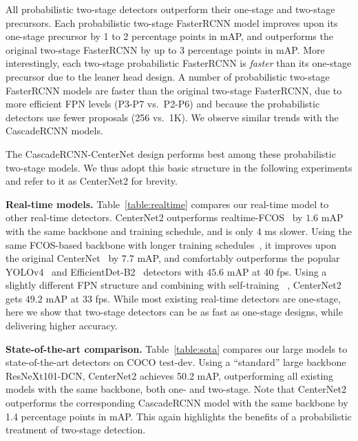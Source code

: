 \documentclass{article}
\renewcommand{\paragraph}[1]{\noindent\textbf{#1}}
\newcommand{\name}{CenterNet2 }
\begin{document}
All probabilistic two-stage detectors outperform their one-stage and two-stage precursors.
Each probabilistic two-stage FasterRCNN model improves upon its one-stage precursor by 1 to 2 percentage points in mAP, and outperforms the original two-stage FasterRCNN by up to 3 percentage points in mAP.
More interestingly, each two-stage probabilistic FasterRCNN is \emph{faster} than its one-stage precursor due to the leaner head design.
A number of probabilistic two-stage FasterRCNN models are faster than the original two-stage FasterRCNN, due to more efficient FPN levels (P3-P7 vs.\ P2-P6) and because the probabilistic detectors 
use
fewer proposals (256 vs.\ 1K).
We observe similar trends with the CascadeRCNN models.

The CascadeRCNN-CenterNet design performs best among these probabilistic two-stage models. We thus adopt this basic structure in the following experiments and refer to it as CenterNet2 for brevity.

\paragraph{Real-time models.}
Table~\ref{table:realtime} compares our real-time model to other real-time detectors.
CenterNet2 outperforms realtime-FCOS~\cite{tian2020fcos} by $1.6$ mAP with the same backbone and training schedule, and is only 4 ms slower.
Using the same FCOS-based backbone with longer training schedules~\cite{tan2020efficientdet,bochkovskiy2020yolov4}, it improves upon the original CenterNet~\cite{zhou2019objects} by $7.7$ mAP, and comfortably outperforms the popular YOLOv4~\cite{bochkovskiy2020yolov4} and EfficientDet-B2~\cite{tan2020efficientdet} detectors with $45.6$ mAP at 40 fps.
Using a slightly different FPN structure and combining with self-training ~\cite{zoph2020rethinking}, CenterNet2 gets $49.2$ mAP at 33 fps.
While most existing real-time detectors are one-stage, 
here we show that two-stage detectors can be as fast as one-stage designs, while delivering higher accuracy.

\paragraph{State-of-the-art comparison.}
Table~\ref{table:sota} compares our large models to state-of-the-art detectors on COCO test-dev.
Using a ``standard'' large backbone ResNeXt101-DCN, \name achieves 50.2 mAP, outperforming all existing models with the same backbone, both one- and two-stage. 
Note that CenterNet2 outperforms the corresponding CascadeRCNN model with the same backbone by 1.4 percentage points in mAP. This again highlights the benefits of a probabilistic treatment of two-stage detection.
\end{document}
